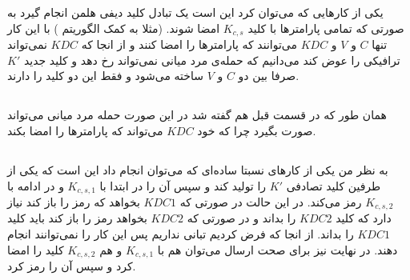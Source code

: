 \documentclass[]{article}
\begin{document}
\printheader

\section{}
\subsection{}
یکی از کار‌هایی که می‌توان کرد این است یک تبادل کلید دیفی هلمن انجام گیرد به صورتی که تمامی
پارامتر‌ها با کلید
$K_{c,s}$
امضا شوند. (مثلا به کمک الگوریتم ) با این کار تنها
$C$ و $V$
و
$KDC$
می‌توانند که پارامتر‌ها را امضا کنند و از انجا که
$KDC$
نمی‌تواند ترافیکی را عوض کند می‌دانیم که حمله‌ی مرد میانی نمی‌تواند رخ دهد و کلید جدید
$K'$
صرفا بین دو
$C$ و $V$
ساخته می‌شود و فقط این دو کلید را دارند.
\subsection{}
همان طور که در قسمت قبل هم گفته شد در این صورت حمله مرد میانی می‌تواند صورت بگیرد چرا که خود
$KDC$
می‌تواند که پارامتر‌ها را امضا بکند.
\subsection{}
به نظر من یکی از کار‌های نسبتا ساده‌ای که می‌توان انجام داد این است که یکی از طرفین کلید تصادفی
$K'$
را تولید کند و سپس آن را در ابتدا با
$K_{c,s,1}$ و در ادامه با $K_{c,s,2}$
رمز می‌کند. در این حالت در صورتی که
$KDC1$
بخواهد که رمز را باز کند نیاز دارد که کلید
$KDC2$
را بداند و در صورتی که
$KDC2$
بخواهد رمز را باز کند باید کلید
$KDC1$
را بداند. از انجا که فرض کردیم تبانی نداریم پس این کار را نمی‌توانند انجام دهند.
در نهایت نیز برای صحت ارسال می‌توان هم با
$K_{c,s,1}$ و هم $K_{c,s,2}$
کلید را امضا کرد و سپس آن را رمز کرد.
\section{}
\end{document}
